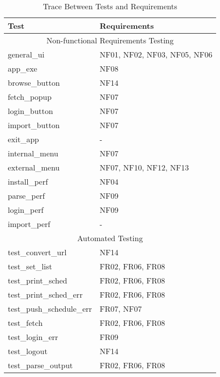 \documentclass[12pt, titlepage]{article}
\begin{document}
 		\begin{table}[!htbp]
			\begin{tabular}{ll}
				\toprule
				Test & Requirements \\               
                
				\midrule
				\multicolumn{2}{c}{Non-functional Requirements Testing} \\
				\midrule
                general\_ui & NF01, NF02, NF03, NF05, NF06 \\
                app\_exe & NF08 \\
                browse\_button & NF14 \\
                fetch\_popup & NF07 \\
                login\_button & NF07 \\
                import\_button & NF07 \\
                exit\_app & - \\
                internal\_menu & NF07 \\
                external\_menu & NF07, NF10, NF12, NF13 \\
                install\_perf & NF04 \\
                parse\_perf & NF09 \\
                login\_perf & NF09 \\
                import\_perf & - \\

				\midrule
				\multicolumn{2}{c}{Automated Testing} \\
				\midrule
                test\_convert\_url & NF14 \\
                test\_set\_list & FR02, FR06, FR08 \\
                test\_print\_sched & FR02, FR06, FR08 \\
                test\_print\_sched\_err & FR02, FR06, FR08 \\
                test\_push\_schedule\_err & FR07, NF07 \\
                test\_fetch & FR02, FR06, FR08 \\
                test\_login\_err & FR09\\
                test\_logout & NF14 \\
                test\_parse\_output & FR02, FR06, FR08 \\

				\bottomrule
			\end{tabular}
			\caption{Trace Between Tests and Requirements}
			\makeatletter
			\def\rulecolor#1#{\CT@arc{#1}}
			\def\CT@arc#1#2{%
				\ifdim\baselineskip=\z@\noalign\fi
				{\gdef\CT@arc@{\color#1{#2}}}}
			\let\CT@arc@\relax
			\makeatother
			\label{Table}
		\end{table}
		
\end{document}
